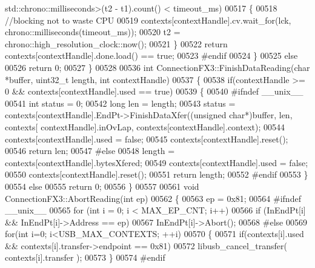 \begin{DoxyCode}
{{{      std::chrono::milliseconds>(t2 - t1).count() < timeout_ms)
00517     \{
00518         \textcolor{comment}{//blocking not to waste CPU}
00519         contexts[contextHandle].cv.wait\_for(lck, chrono::milliseconds(timeout\_ms));
00520         t2 = chrono::high\_resolution\_clock::now();
00521     \}
00522     \textcolor{keywordflow}{return} contexts[contextHandle].done.load() == \textcolor{keyword}{true};
00523 \textcolor{preprocessor}{    #endif}
00524     \}
00525     \textcolor{keywordflow}{else}
00526         \textcolor{keywordflow}{return} 0;
00527 \}
00528 
00536 \textcolor{keywordtype}{int} ConnectionFX3::FinishDataReading(\textcolor{keywordtype}{char} *buffer, uint32\_t length, \textcolor{keywordtype}{int} contextHandle)
00537 \{
00538     \textcolor{keywordflow}{if}(contextHandle >= 0 && contexts[contextHandle].used == \textcolor{keyword}{true})
00539     \{
00540 \textcolor{preprocessor}{    #ifndef \_\_unix\_\_}
00541     \textcolor{keywordtype}{int} status = 0;
00542     \textcolor{keywordtype}{long} len = length;
00543     status = contexts[contextHandle].EndPt->FinishDataXfer((\textcolor{keywordtype}{unsigned} \textcolor{keywordtype}{char}*)buffer, len, contexts[
      contextHandle].inOvLap, contexts[contextHandle].context);
00544     contexts[contextHandle].used = \textcolor{keyword}{false};
00545     contexts[contextHandle].reset();
00546     \textcolor{keywordflow}{return} len;
00547 \textcolor{preprocessor}{    #else}
00548     length = contexts[contextHandle].bytesXfered;
00549     contexts[contextHandle].used = \textcolor{keyword}{false};
00550     contexts[contextHandle].reset();
00551     \textcolor{keywordflow}{return} length;
00552 \textcolor{preprocessor}{    #endif}
00553     \}
00554     \textcolor{keywordflow}{else}
00555         \textcolor{keywordflow}{return} 0;
00556 \}
00557 
00561 \textcolor{keywordtype}{void} ConnectionFX3::AbortReading(\textcolor{keywordtype}{int} ep)
00562 \{
00563     ep = 0x81;
00564 \textcolor{preprocessor}{#ifndef \_\_unix\_\_}
00565     \textcolor{keywordflow}{for} (\textcolor{keywordtype}{int} i = 0; i < MAX\_EP\_CNT; i++)
00566         \textcolor{keywordflow}{if} (InEndPt[i] && InEndPt[i]->Address == ep)
00567             InEndPt[i]->Abort();
00568 \textcolor{preprocessor}{#else}
00569     \textcolor{keywordflow}{for}(\textcolor{keywordtype}{int} i=0; i<USB\_MAX\_CONTEXTS; ++i)
00570     \{
00571         \textcolor{keywordflow}{if}(contexts[i].used && contexts[i].transfer->endpoint == 0x81)
00572             libusb\_cancel\_transfer( contexts[i].transfer );
00573     \}
00574 \textcolor{preprocessor}{#endif}
}}}
\end{DoxyCode}
